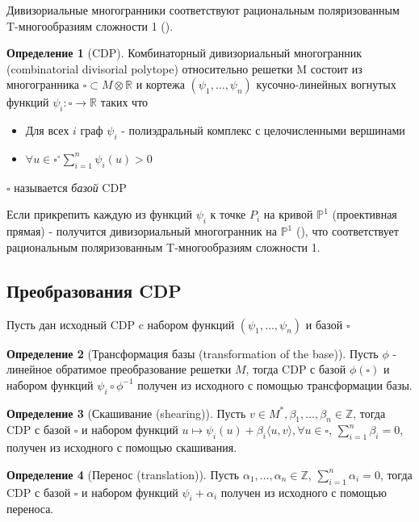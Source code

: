 \documentclass[fontsize=14pt]{scrartcl}
\theoremstyle{definition}
\newtheorem{definition}{Определение}[section]
\begin{document}
Дивизориальные многогранники соответствуют рациональным поляризованным T-многообразиям сложности 1 (\cite{vars}).

\begin{definition}[CDP] 
Комбинаторный дивизориальный многогранник (combinatorial divisorial polytope) относительно решетки M состоит из многогранника $\square \subset M \otimes \mathds{R}$ и кортежа $(\psi_1, \dots, \psi_n)$ кусочно-линейных вогнутых функций $\psi_i: \square \rightarrow \mathds{R}$ таких что
\begin{itemize}
	\item[1] Для всех $i$ граф $\psi_i$ - полиэдральный комплекс с целочисленными вершинами
	\item[2] $\forall u \in \square^{\circ} \sum_{i=1}^n\psi_i(u) > 0$
\end{itemize}
$\square$ называется \emph{базой} CDP
\end{definition}

Если прикрепить каждую из функций $\psi_i$ к точке $P_i$ на кривой $\mathds{P}^1$ (проективная прямая) - получится дивизориальный многогранник на $\mathds{P}^1$ (\cite{main}), что соответствует рациональным поляризованным T-многообразиям сложности 1.

\subsection{Преобразования CDP}
Пусть дан исходный CDP c набором функций $(\psi_1, \dots, \psi_n)$ и базой $\square$

\begin{definition}[Трансформация базы (transformation of the base)]
Пусть $\phi$ - линейное обратимое преобразование решетки $M$, тогда CDP с базой $\phi(\square)$ и набором функций 
$\psi_i \circ \phi^{-1}$ получен из исходного с помощью  трансформации базы.
\end{definition}

\begin{definition}[Скашивание (shearing)]
Пусть $v \in M^*, \beta_1, \dots, \beta_n \in \mathds{Z}$, тогда CDP с базой $\square$ и набором функций $u \mapsto
 \psi_i(u) + \beta_i\langle u, v \rangle, \forall u \in \square$, $\sum_{i=1}^n \beta_i = 0$, получен из исходного с помощью скашивания.
\end{definition}

\begin{definition}[Перенос (translation)]
Пусть $\alpha_1, \dots, \alpha_n \in \mathds{Z}
$, $\sum_{i=1}^n \alpha_i = 0$, тогда CDP с базой $\square$ и набором функций $\psi_i + \alpha_i$ получен из исходного с помощью переноса.
\end{definition}
\end{document}
